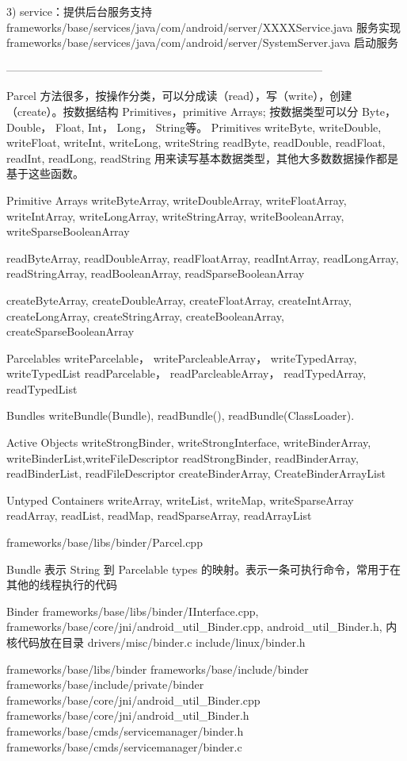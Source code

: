 \documentclass{book}
\begin{document}
\begin{CJK}{UTF8}{gbsn}
{3)         service：提供后台服务支持
frameworks/base/services/java/com/android/server/XXXXService.java 服务实现
frameworks/base/services/java/com/android/server/SystemServer.java   启动服务

--------------------------------------------------------------------------------------


Parcel  方法很多，按操作分类，可以分成读（read），写（write），创建（create）。按数据结构
Primitives，primitive Arrays; 按数据类型可以分 Byte， Double， Float, Int，
Long， String等。
Primitives
writeByte, writeDouble, writeFloat, writeInt, writeLong, writeString
readByte,   readDouble, readFloat,  readInt,  readLong,  readString
用来读写基本数据类型，其他大多数数据操作都是基于这些函数。

Primitive Arrays
writeByteArray, writeDoubleArray, writeFloatArray, writeIntArray,
writeLongArray, writeStringArray, writeBooleanArray, writeSparseBooleanArray

readByteArray, readDoubleArray, readFloatArray, readIntArray,
readLongArray, readStringArray, readBooleanArray, readSparseBooleanArray

createByteArray, createDoubleArray, createFloatArray, createIntArray,
createLongArray, createStringArray, createBooleanArray, createSparseBooleanArray

Parcelables
writeParcelable， writeParcleableArray， writeTypedArray, writeTypedList
readParcelable，  readParcleableArray，  readTypedArray,  readTypedList

Bundles
writeBundle(Bundle), readBundle(),  readBundle(ClassLoader).

Active Objects
writeStrongBinder, writeStrongInterface, writeBinderArray,
writeBinderList,writeFileDescriptor
readStrongBinder, readBinderArray, readBinderList, readFileDescriptor
createBinderArray, CreateBinderArrayList

Untyped Containers
writeArray, writeList,  writeMap, writeSparseArray
readArray,  readList,   readMap,  readSparseArray, readArrayList

frameworks/base/libs/binder/Parcel.cpp


Bundle  表示 String 到 Parcelable types 的映射。表示一条可执行命令，常用于在其他的线程执行的代码


Binder
frameworks/base/libs/binder/IInterface.cpp,
frameworks/base/core/jni/android_util_Binder.cpp, android_util_Binder.h, 
内核代码放在目录 drivers/misc/binder.c
include/linux/binder.h

frameworks/base/libs/binder
frameworks/base/include/binder
frameworks/base/include/private/binder
frameworks/base/core/jni/android_util_Binder.cpp
frameworks/base/core/jni/android_util_Binder.h
frameworks/base/cmds/servicemanager/binder.h
frameworks/base/cmds/servicemanager/binder.c

}
\end{CJK}
\end{document}
